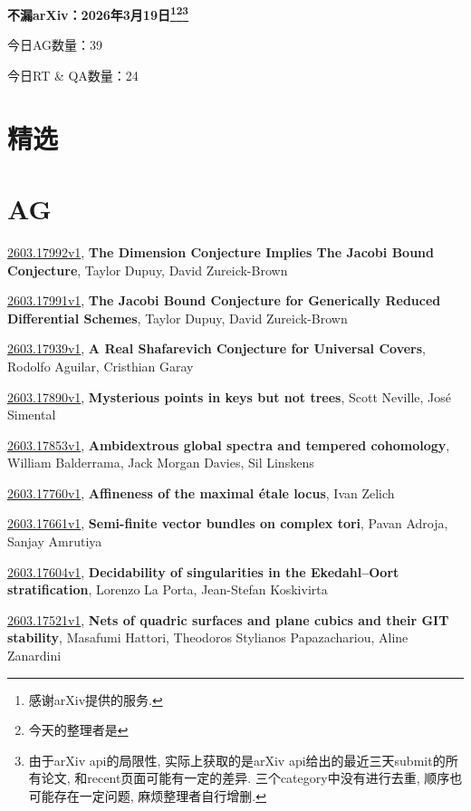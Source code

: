 \documentclass[9pt, a4paper]{article}
\theoremstyle{plain}
\theoremstyle{definition}
\theoremstyle{remark}
\newcommand{\arxiv}[3]{\href{https://arxiv.org/abs/#1}{#1}, \textbf{\textcolor{arxivblue}{#2}}, #3}
\newcommand{\AGnumber}{39}
\newcommand{\RTQAnumber}{24}
\newcommand{\NewestDate}{2026年3月19日}
\newcommand{\todayarXiver}{} %
\begin{document}
\begin{center}
    \Huge\textbf{不漏arXiv：\NewestDate\footnote{感谢arXiv提供的服务.}\footnote{今天的整理者是\todayarXiver}\footnote{由于arXiv api的局限性, 实际上获取的是arXiv api给出的最近三天submit的所有论文, 和recent页面可能有一定的差异. 三个category中没有进行去重, 顺序也可能存在一定问题, 麻烦整理者自行增删.}} \\
\end{center}

\setcounter{section}{-1}

\begin{center}
    今日AG数量：\AGnumber
    
    今日RT \& QA数量：\RTQAnumber
    
\end{center}


\section{精选}


\section{AG}
\arxiv{2603.17992v1}{The Dimension Conjecture Implies The Jacobi Bound Conjecture}{Taylor Dupuy, David Zureick-Brown}

\arxiv{2603.17991v1}{The Jacobi Bound Conjecture for Generically Reduced Differential Schemes}{Taylor Dupuy, David Zureick-Brown}

\arxiv{2603.17939v1}{A Real Shafarevich Conjecture for Universal Covers}{Rodolfo Aguilar, Cristhian Garay}

\arxiv{2603.17890v1}{Mysterious points in keys but not trees}{Scott Neville, José Simental}

\arxiv{2603.17853v1}{Ambidextrous global spectra and tempered cohomology}{William Balderrama, Jack Morgan Davies, Sil Linskens}

\arxiv{2603.17760v1}{Affineness of the maximal étale locus}{Ivan Zelich}

\arxiv{2603.17661v1}{Semi-finite vector bundles on complex tori}{Pavan Adroja, Sanjay Amrutiya}

\arxiv{2603.17604v1}{Decidability of singularities in the Ekedahl--Oort stratification}{Lorenzo La Porta, Jean-Stefan Koskivirta}

\arxiv{2603.17521v1}{Nets of quadric surfaces and plane cubics and their GIT stability}{Masafumi Hattori, Theodoros Stylianos Papazachariou, Aline Zanardini}
\end{document}
